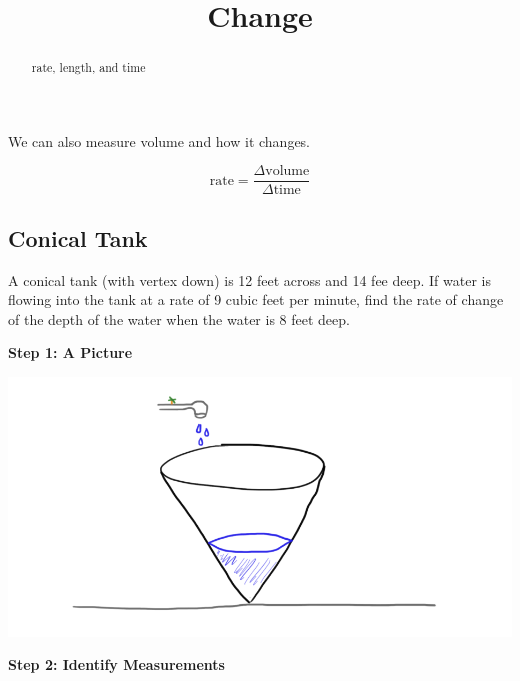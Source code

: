 \documentclass{ximera}
\title{Change}
\begin{document}
\begin{abstract}
rate, length, and time
\end{abstract}
\maketitle



We can also measure volume and how it changes.



\[
\text{rate} = \frac{\Delta \text{volume}}{\Delta \text{time}} 
\]








\subsection{Conical Tank}

A conical tank (with vertex down) is 12 feet across and 14 fee deep. If water is flowing into the tank at a rate of 9 cubic feet per minute, find the rate of change of the depth of the water when the water is 8 feet deep.






\textbf{\textcolor{purple!85!blue}{Step 1: A Picture}}


\begin{image}
\includegraphics{pics/cone_1.png}
\end{image}




\textbf{\textcolor{purple!85!blue}{Step 2: Identify Measurements}}
\end{document}
